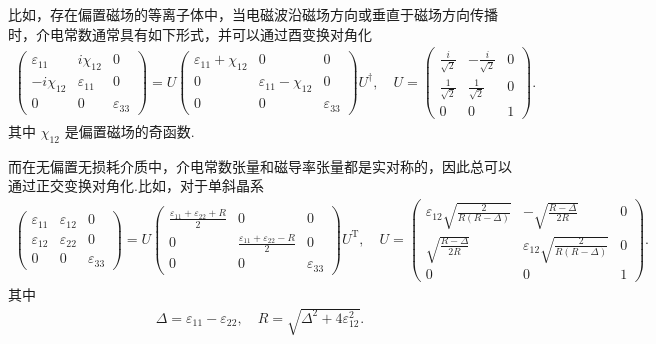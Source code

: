 比如，存在偏置磁场的等离子体中，当电磁波沿磁场方向或垂直于磁场方向传播时，介电常数通常具有如下形式，并可以通过酉变换对角化
\begin{align*}
	\begin{pmatrix}\varepsilon_{11} & i\chi_{12} & 0 \\ -i\chi_{12} & \varepsilon_{11} & 0 \\ 0 & 0 & \varepsilon_{33}\end{pmatrix} =U \begin{pmatrix}\varepsilon_{11}+\chi_{12} & 0 & 0 \\ 0 & \varepsilon_{11}-\chi_{12} & 0 \\ 0 & 0 & \varepsilon_{33}\end{pmatrix}U^\dagger,\quad U=\begin{pmatrix}\frac{i}{\sqrt{2}} & -\frac{i}{\sqrt{2}} & 0 \\ \frac{1}{\sqrt{2}} & \frac{1}{\sqrt{2}} & 0 \\ 0 & 0 & 1\end{pmatrix}.
\end{align*}
其中 \(\chi_{12}\) 是偏置磁场的奇函数.

而在无偏置无损耗介质中，介电常数张量和磁导率张量都是实对称的，因此总可以通过正交变换对角化.比如，对于单斜晶系
\begin{align*}
	\begin{pmatrix}\varepsilon_{11} & \varepsilon_{12} & 0 \\ \varepsilon_{12} & \varepsilon_{22} & 0 \\ 0 & 0 & \varepsilon_{33}\end{pmatrix}= U\begin{pmatrix}\frac{\varepsilon_{11}+\varepsilon_{22}+R}{2} & 0 & 0 \\ 0 & \frac{\varepsilon_{11}+\varepsilon_{22}-R}{2} & 0 \\ 0 & 0 & \varepsilon_{33}\end{pmatrix}U^\mathrm{T},\quad U=\begin{pmatrix}\varepsilon_{12}\sqrt{\frac{2}{R(R-\Delta)}} & -\sqrt{\frac{R-\Delta}{2R}} & 0 \\ \sqrt{\frac{R-\Delta}{2R}} & \varepsilon_{12}\sqrt{\frac{2}{R(R-\Delta)}} & 0 \\ 0 & 0 & 1\end{pmatrix}.
\end{align*}
其中
\begin{align*}
	\Delta=\varepsilon_{11}-\varepsilon_{22},\quad R=\sqrt{\Delta^2+4\varepsilon_{12}^2}.
\end{align*}

